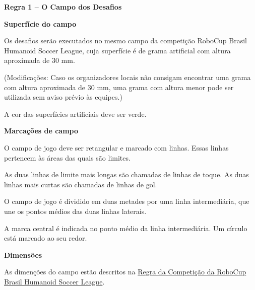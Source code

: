 \clearpage
\sffamily
{\bfseries\color[rgb]{0.4,0.4,0.4}
Regra 1 – O Campo dos Desafios}
{}

\bigskip
{\bfseries Superfície do campo}

\headlinebox
Os desafios serão executados no mesmo campo da competição RoboCup Brasil Humanoid Soccer League, cuja superfície é de grama artificial com altura aproximada de 30 mm.

\bigskip

(Modificações: Caso os organizadores locais não consigam encontrar uma grama com altura aproximada de 30 mm, uma grama com altura menor pode ser utilizada sem aviso prévio às equipes.)

\bigskip
{\sffamily
A cor das superfícies artificiais deve ser verde.}

\bigskip
{\bfseries
Marcações de campo}

\headlinebox

O campo de jogo deve ser retangular e marcado com linhas. Essas linhas pertencem às áreas das quais são limites.

\bigskip

As duas linhas de limite mais longas são chamadas de linhas de toque. As duas linhas mais curtas são chamadas de linhas de gol.

\bigskip

O campo de jogo é dividido em duas metades por uma linha intermediária, que une os pontos médios das duas linhas laterais.

\bigskip

A marca central é indicada no ponto médio da linha intermediária.
Um círculo está marcado ao seu redor.

\bigskip

{\textbf{Dimensões}}

\headlinebox

As dimenções do campo estão descritos na \href{https://cbr.robocup.org.br/wp-content/uploads/2024/04/LARC2024.pdf}{\textcolor[rgb]{0,0,0.5 }{Regra da Competição da RoboCup Brasil Humanoid Soccer League}}.